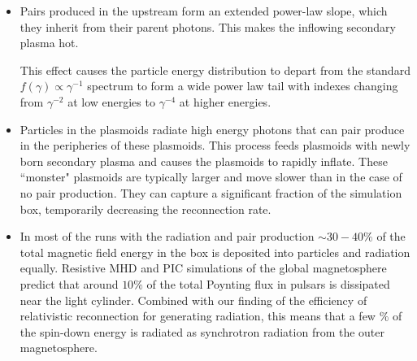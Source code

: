 \begin{itemize}[leftmargin=*,wide = 0pt]
    \item Pairs produced in the upstream form an extended power-law slope, which they inherit from their parent photons. This makes the inflowing secondary plasma hot.

    This effect causes the particle energy distribution to depart from the standard $f(\gamma)\propto \gamma^{-1}$ spectrum to form a wide power law tail with indexes changing from $\gamma^{-2}$ at low energies to $\gamma^{-4}$ at higher energies.
\end{itemize}

\begin{itemize}[leftmargin=*,wide = 0pt]
    \item Particles in the plasmoids radiate high energy photons that can pair produce in the peripheries of these plasmoids. This process feeds plasmoids with newly born secondary plasma and causes the plasmoids to rapidly inflate. These ``monster" plasmoids are typically larger and move slower than in the case of no pair production. They can capture a significant fraction of the simulation box, temporarily decreasing the reconnection rate.
\end{itemize}



\begin{itemize}[leftmargin=*,wide = 0pt]
    \item In most of the runs with the radiation and pair production $\sim30-40\%$ of the total magnetic field energy in the box is deposited into particles and radiation equally. Resistive MHD \citep{2012ApJ...749....2K} and PIC \citep{2014ApJ...785L..33P} simulations of the global magnetosphere predict that around $10\%$ of the total Poynting flux in pulsars is dissipated near the light cylinder. Combined with our finding of the efficiency of relativistic reconnection for generating radiation, this means that a few $\%$ of the spin-down energy is radiated as synchrotron radiation from the outer magnetosphere.
\end{itemize}

